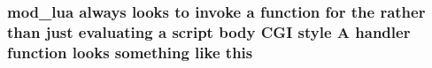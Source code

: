 \subsubsection[{\texorpdfstring{this}{this}}]{\setlength{\rightskip}{0pt plus 5cm}mod\+\_\+lua always looks {\bf to} invoke {\bf a} {\bf function} for the rather {\bf than} just evaluating {\bf a} {\bf script} {\bf body} C\+GI {\bf style} {\bf A} {\bf handler} {\bf function} looks something like this}\hypertarget{writing-handlers_8txt_a1578efb5178d735b3ed21720d664c84b}{}\label{writing-handlers_8txt_a1578efb5178d735b3ed21720d664c84b}
